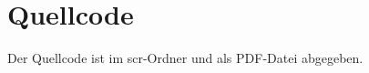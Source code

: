 \chapter{Quellcode}\label{ch:quellcode}
Der Quellcode ist im scr-Ordner und als PDF-Datei abgegeben.